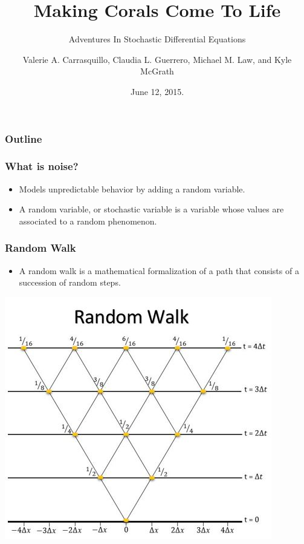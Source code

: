 \documentclass{beamer}
\begin{document}
\author{Valerie A. Carrasquillo, Claudia L. Guerrero, Michael M. Law, and Kyle McGrath}

\title{Making Corals Come To Life}
\subtitle{Adventures In Stochastic Differential Equations}
\date{June 12, 2015.}

\begin{frame}
  \titlepage
\end{frame}

\begin{frame}
  \frametitle{Outline}
  \tableofcontents
\end{frame}

\begin{frame}
  \frametitle{What is noise?}
  \begin{itemize}
  \item Models unpredictable behavior by adding a random variable.
  \item A random variable, or stochastic variable is a variable whose values are associated to a random phenomenon.
  \end{itemize}
\end{frame}

\begin{frame}
  \frametitle{Random Walk}
  \begin{itemize}
  \item A random walk is a mathematical formalization of a path that consists of a succession of random steps.
  \end{itemize}
  \centering
  \includegraphics[scale=0.67]{RandomWalk}
\end{frame}
\end{document}
